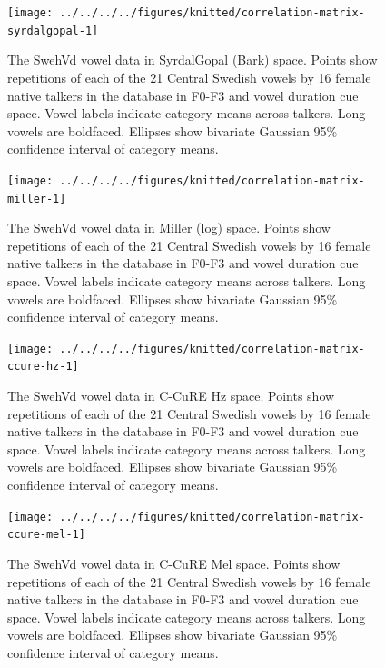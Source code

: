 \documentclass[utf8]{frontiers_suppmat} %
\begin{document}
\begin{figure}[H]
\texttt{[image: ../../../../figures/knitted/correlation-matrix-syrdalgopal-1]} \caption{The SwehVd vowel data in SyrdalGopal (Bark) space. Points show repetitions of each of the 21 Central Swedish vowels by 16 female native talkers in the database in F0-F3 and vowel duration cue space. Vowel labels indicate category means across talkers. Long vowels are boldfaced. Ellipses show bivariate Gaussian 95\% confidence interval of category means.}\label{fig:correlation-matrix-syrdalgopal}
\end{figure}



\begin{figure}[H]
\texttt{[image: ../../../../figures/knitted/correlation-matrix-miller-1]} \caption{The SwehVd vowel data in Miller (log) space. Points show repetitions of each of the 21 Central Swedish vowels by 16 female native talkers in the database in F0-F3 and vowel duration cue space. Vowel labels indicate category means across talkers. Long vowels are boldfaced. Ellipses show bivariate Gaussian 95\% confidence interval of category means.}\label{fig:correlation-matrix-miller}
\end{figure}



\begin{figure}[H]
\texttt{[image: ../../../../figures/knitted/correlation-matrix-ccure-hz-1]} \caption{The SwehVd vowel data in C-CuRE Hz space. Points show repetitions of each of the 21 Central Swedish vowels by 16 female native talkers in the database in F0-F3 and vowel duration cue space. Vowel labels indicate category means across talkers. Long vowels are boldfaced. Ellipses show bivariate Gaussian 95\% confidence interval of category means.}\label{fig:correlation-matrix-ccure-hz}
\end{figure}



\begin{figure}[H]
\texttt{[image: ../../../../figures/knitted/correlation-matrix-ccure-mel-1]} \caption{The SwehVd vowel data in C-CuRE Mel space. Points show repetitions of each of the 21 Central Swedish vowels by 16 female native talkers in the database in F0-F3 and vowel duration cue space. Vowel labels indicate category means across talkers. Long vowels are boldfaced. Ellipses show bivariate Gaussian 95\% confidence interval of category means.}\label{fig:correlation-matrix-ccure-mel}
\end{figure}
\end{document}
